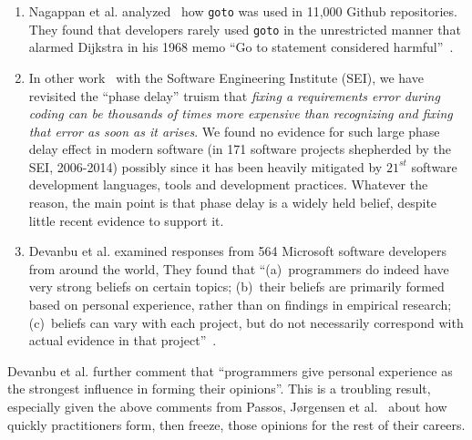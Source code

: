 \documentclass{sig-alternate}
\begin{document}
\begin{enumerate} 
\item
Nagappan et al. analyzed~\cite{mei15} 
how   {\tt goto}  was used  in 11,000 Github repositories. 
They found that developers
rarely used {\tt goto} in the unrestricted manner that alarmed Dijkstra in his  1968
memo ``Go to statement considered harmful''~\cite{Dijkstra68}.
\item
In other work~\cite{me16phase} with the Software Engineering Institute (SEI), we have revisited
the ``phase delay'' truism that {\em fixing a requirements error  during
coding can be thousands of times more expensive than recognizing and fixing that error
as soon as it arises}. 
We found no evidence for such large   phase delay effect in modern
software (in 171 software projects shepherded
by the SEI, 2006-2014) possibly since it has been  heavily mitigated by $21^{st}$ software development languages, tools and development practices. 
Whatever the reason, the main point  is that phase delay is a widely
held belief, despite little recent evidence to support it.
\item
Devanbu et al.  examined responses from 564 Microsoft software developers from around
the world, They found that  ``(a)~programmers do indeed have very
strong beliefs on certain topics; (b)~their beliefs are primarily formed
based on personal experience, rather than on findings in empirical
research; (c)~beliefs can vary with each project, but do not necessarily
correspond with actual evidence in that project''~\cite{prem16}.
\end{enumerate}
Devanbu et al. further  comment that ``programmers give personal experience
as the strongest influence in forming their opinions''. This is a troubling
result, especially given the above comments from Passos,  J{\o}rgensen et al.~\cite{passos11,jorgensen09} about how quickly practitioners form, then freeze, those opinions for the rest of their
careers.
\end{document}
